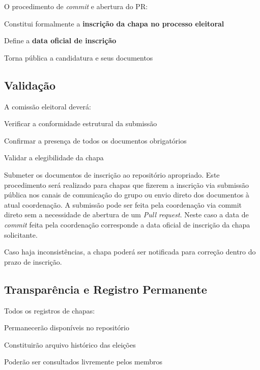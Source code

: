 \documentclass[
  12pt,          %
  a4paper,       %
  oneside,       %
  brazil         %
]{article}
\begin{document}
O procedimento de \textit{commit} e abertura do PR:

\begin{conduta}
	\item Constitui formalmente a \textbf{inscrição da chapa no processo eleitoral}
	\item Define a \textbf{data oficial de inscrição}
	\item Torna pública a candidatura e seus documentos
\end{conduta}

\subsection{Validação}

A comissão eleitoral deverá:

\begin{conduta}
	\item Verificar a conformidade estrutural da submissão
	\item Confirmar a presença de todos os documentos obrigatórios
	\item Validar a elegibilidade da chapa
	\item Submeter os documentos de inscrição ao repositório apropriado. Este procedimento será realizado para chapas que fizerem a inscrição via submissão pública 
	nos canais de comunicação do grupo ou envio direto dos documentos à atual coordenação. A submissão pode ser feita pela coordenação via commit direto sem a 
	necessidade de abertura de um \textit{Pull request}. Neste caso a data de \textit{commit} feita pela coordenação corresponde a data oficial de inscrição da chapa solicitante.
\end{conduta}

Caso haja inconsistências, a chapa poderá ser notificada para correção dentro do prazo de inscrição.

\subsection{Transparência e Registro Permanente}

Todos os registros de chapas:

\begin{conduta}
	\item Permanecerão disponíveis no repositório
	\item Constituirão arquivo histórico das eleições
	\item Poderão ser consultados livremente pelos membros
\end{conduta}
\end{document}
